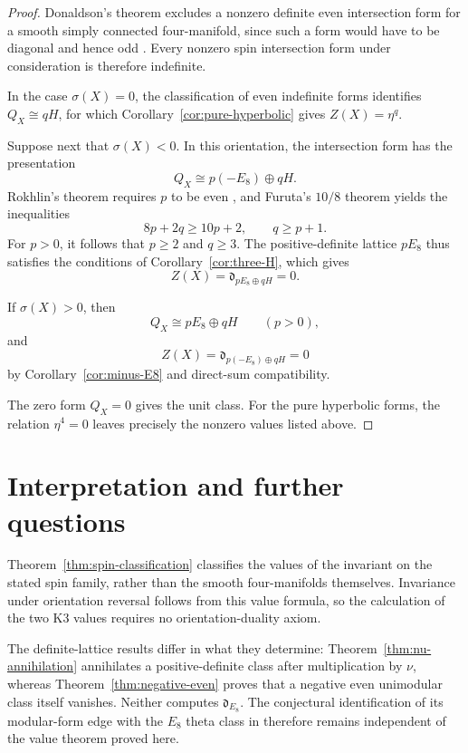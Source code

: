 \documentclass[11pt,a4paper]{amsart}
\newcommand{\dclass}{\mathfrak d}
\theoremstyle{plain}
\theoremstyle{definition}
\theoremstyle{remark}
\begin{document}
\begin{proof}
Donaldson's theorem excludes a nonzero definite even
intersection form for a smooth simply connected four-manifold,
since such a form would have to be diagonal and hence odd
\cite{Donaldson}. Every nonzero spin intersection form
under consideration is therefore indefinite.

In the case $\sigma(X)=0$, the classification of even
indefinite forms identifies $Q_X\cong qH$, for which
Corollary~\ref{cor:pure-hyperbolic} gives $Z(X)=\eta^q$.

Suppose next that $\sigma(X)<0$. In this orientation,
the intersection form has the presentation
\[
 Q_X\cong p(-E_8)\oplus qH.
\]
Rokhlin's theorem requires $p$ to be even
\cite{Rokhlin}, and Furuta's $10/8$ theorem \cite{Furuta}
yields the inequalities
\[
 8p+2q\ge10p+2,
 \qquad
 q\ge p+1.
\]
For $p>0$, it follows that $p\ge2$ and $q\ge3$.
The positive-definite lattice $pE_8$ thus satisfies the
conditions of Corollary~\ref{cor:three-H}, which gives
\[
 Z(X)=\dclass_{pE_8\oplus qH}=0.
\]

If $\sigma(X)>0$, then
\[
 Q_X\cong pE_8\oplus qH
 \qquad(p>0),
\]
and
\[
 Z(X)=\dclass_{p(-E_8)\oplus qH}=0
\]
by Corollary~\ref{cor:minus-E8} and direct-sum compatibility.

The zero form $Q_X=0$ gives the unit class. For the pure
hyperbolic forms, the relation $\eta^4=0$ leaves precisely
the nonzero values listed above.
\end{proof}

\section{Interpretation and further questions}\label{sec:scope}

Theorem~\ref{thm:spin-classification} classifies the values
of the invariant on the stated spin family, rather than the
smooth four-manifolds themselves. Invariance under orientation
reversal follows from this value formula, so the calculation
of the two K3 values requires no orientation-duality axiom.

The definite-lattice results differ in what they determine:
Theorem~\ref{thm:nu-annihilation} annihilates a
positive-definite class after multiplication by $\nu$,
whereas Theorem~\ref{thm:negative-even} proves that a negative
even unimodular class itself vanishes. Neither computes
$\dclass_{E_8}$. The conjectural identification of its
modular-form edge with the $E_8$ theta class in \cite{GKMP}
therefore remains independent of the value theorem proved here.
\end{document}
